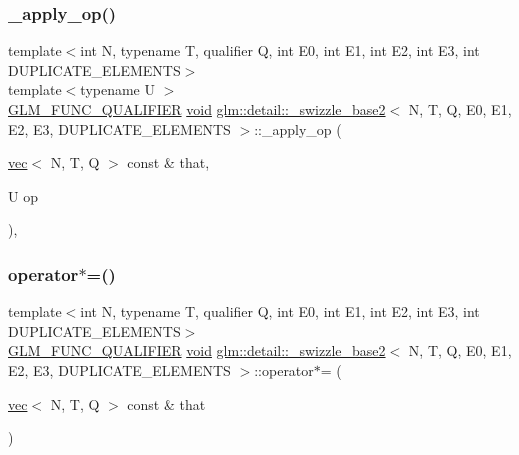 \subsubsection{\texorpdfstring{\+\_\+apply\+\_\+op()}{\_apply\_op()}}
{\footnotesize\ttfamily template$<$int N, typename T, qualifier Q, int E0, int E1, int E2, int E3, int D\+U\+P\+L\+I\+C\+A\+T\+E\+\_\+\+E\+L\+E\+M\+E\+N\+TS$>$ \\
template$<$typename U $>$ \\
\hyperlink{setup_8hpp_a33fdea6f91c5f834105f7415e2a64407}{G\+L\+M\+\_\+\+F\+U\+N\+C\+\_\+\+Q\+U\+A\+L\+I\+F\+I\+ER} \hyperlink{_s_d_l__opengles2__gl2ext_8h_ae5d8fa23ad07c48bb609509eae494c95}{void} \hyperlink{structglm_1_1detail_1_1__swizzle__base2}{glm\+::detail\+::\+\_\+swizzle\+\_\+base2}$<$ N, T, Q, E0, E1, E2, E3, D\+U\+P\+L\+I\+C\+A\+T\+E\+\_\+\+E\+L\+E\+M\+E\+N\+TS $>$\+::\+\_\+apply\+\_\+op (\begin{DoxyParamCaption}\item[{\hyperlink{structglm_1_1vec}{vec}$<$ N, T, Q $>$ const \&}]{that,  }\item[{U}]{op }\end{DoxyParamCaption})\hspace{0.3cm}{\ttfamily [inline]}, {\ttfamily [protected]}}

\mbox{\label{structglm_1_1detail_1_1__swizzle__base2_a41a9fe45545f5adcd0c529c3a426e29f}} 
\subsubsection{\texorpdfstring{operator$\ast$=()}{operator*=()}}
{\footnotesize\ttfamily template$<$int N, typename T, qualifier Q, int E0, int E1, int E2, int E3, int D\+U\+P\+L\+I\+C\+A\+T\+E\+\_\+\+E\+L\+E\+M\+E\+N\+TS$>$ \\
\hyperlink{setup_8hpp_a33fdea6f91c5f834105f7415e2a64407}{G\+L\+M\+\_\+\+F\+U\+N\+C\+\_\+\+Q\+U\+A\+L\+I\+F\+I\+ER} \hyperlink{_s_d_l__opengles2__gl2ext_8h_ae5d8fa23ad07c48bb609509eae494c95}{void} \hyperlink{structglm_1_1detail_1_1__swizzle__base2}{glm\+::detail\+::\+\_\+swizzle\+\_\+base2}$<$ N, T, Q, E0, E1, E2, E3, D\+U\+P\+L\+I\+C\+A\+T\+E\+\_\+\+E\+L\+E\+M\+E\+N\+TS $>$\+::operator$\ast$= (\begin{DoxyParamCaption}\item[{\hyperlink{structglm_1_1vec}{vec}$<$ N, T, Q $>$ const \&}]{that }\end{DoxyParamCaption})\hspace{0.3cm}{\ttfamily [inline]}}

